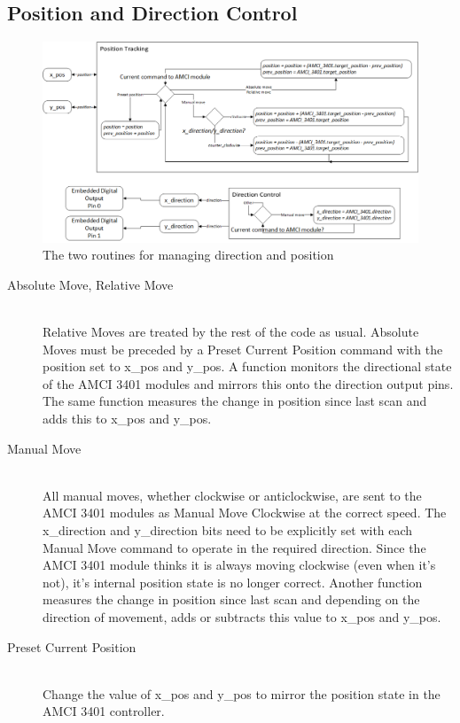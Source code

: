 \subsection{Position and Direction Control}
\label{sec:PLC-flowcharts-pos}

	\begin{figure}[htbp!]
		\includegraphics[width=\textwidth]{figures/cncMachine/position_direction}
		\caption{The two routines for managing direction and position}
		\label{fig:Direction and Positional Tracking}
	\end{figure}
	
				\begin{description}
					\item[Absolute Move, Relative Move] \hfill \\
						Relative Moves are treated by the rest of the code as usual. Absolute Moves must be preceded by a Preset Current Position command with the position set to x\_pos and y\_pos. A function monitors the directional state of the AMCI 3401 modules and mirrors this onto the direction output pins. The same function measures the change in position since last scan and adds this to x\_pos and y\_pos.
					\item[Manual Move] \hfill \\
						All manual moves, whether clockwise or anticlockwise, are sent to the AMCI 3401 modules as Manual Move Clockwise at the correct speed. The x\_direction and y\_direction bits need to be explicitly set with each Manual Move command to operate in the required direction. Since the AMCI 3401 module thinks it is always moving clockwise (even when it's not), it's internal position state is no longer correct. Another function measures the change in position since last scan and depending on the direction of movement, adds or subtracts this value to x\_pos and y\_pos.
					\item[Preset Current Position] \hfill \\
						Change the value of x\_pos and y\_pos to mirror the position state in the AMCI 3401 controller.
				\end{description}
				
